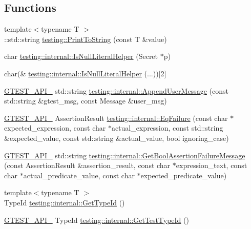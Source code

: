 \subsection*{Functions}
\begin{DoxyCompactItemize}
\item 
{\footnotesize template$<$typename T $>$ }\\\+::std\+::string \hyperlink{namespacetesting_aa5717bb1144edd1d262d310ba70c82ed}{testing\+::\+Print\+To\+String} (const T \&value)
\item 
char \hyperlink{namespacetesting_1_1internal_afb0731ba39ffef1fa1730ac0699c9025}{testing\+::internal\+::\+Is\+Null\+Literal\+Helper} (Secret $\ast$p)
\item 
char(\& \hyperlink{namespacetesting_1_1internal_ab53ecfa1632a871ce7c692d722a75a57}{testing\+::internal\+::\+Is\+Null\+Literal\+Helper} (...))\mbox{[}2\mbox{]}
\item 
\hyperlink{gtest-port_8h_aa73be6f0ba4a7456180a94904ce17790}{G\+T\+E\+S\+T\+\_\+\+A\+P\+I\+\_\+} std\+::string \hyperlink{namespacetesting_1_1internal_ae475a090bca903bb222dd389eb189166}{testing\+::internal\+::\+Append\+User\+Message} (const std\+::string \&gtest\+\_\+msg, const Message \&user\+\_\+msg)
\item 
\hyperlink{gtest-port_8h_aa73be6f0ba4a7456180a94904ce17790}{G\+T\+E\+S\+T\+\_\+\+A\+P\+I\+\_\+} Assertion\+Result \hyperlink{namespacetesting_1_1internal_a08725846ff184d3e79bcf5be4df19157}{testing\+::internal\+::\+Eq\+Failure} (const char $\ast$expected\+\_\+expression, const char $\ast$actual\+\_\+expression, const std\+::string \&expected\+\_\+value, const std\+::string \&actual\+\_\+value, bool ignoring\+\_\+case)
\item 
\hyperlink{gtest-port_8h_aa73be6f0ba4a7456180a94904ce17790}{G\+T\+E\+S\+T\+\_\+\+A\+P\+I\+\_\+} std\+::string \hyperlink{namespacetesting_1_1internal_a5fd6e5dc9eb20ab3c3a80e24d89dfac6}{testing\+::internal\+::\+Get\+Bool\+Assertion\+Failure\+Message} (const Assertion\+Result \&assertion\+\_\+result, const char $\ast$expression\+\_\+text, const char $\ast$actual\+\_\+predicate\+\_\+value, const char $\ast$expected\+\_\+predicate\+\_\+value)
\item 
{\footnotesize template$<$typename T $>$ }\\Type\+Id \hyperlink{namespacetesting_1_1internal_a6b108e56fdc68ea937ffb3759fb55ab0}{testing\+::internal\+::\+Get\+Type\+Id} ()
\item 
\hyperlink{gtest-port_8h_aa73be6f0ba4a7456180a94904ce17790}{G\+T\+E\+S\+T\+\_\+\+A\+P\+I\+\_\+} Type\+Id \hyperlink{namespacetesting_1_1internal_ad0d66d56ead224263cd100c1d6bfc562}{testing\+::internal\+::\+Get\+Test\+Type\+Id} ()

\end{DoxyCompactItemize}

